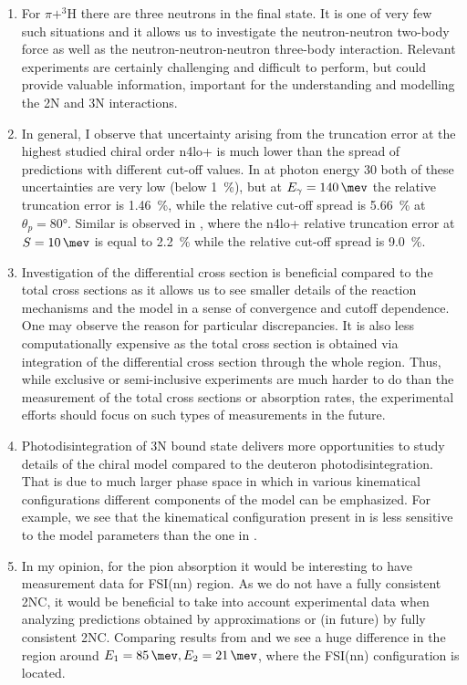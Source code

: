 \begin{enumerate}
    \item For $\pi + ^3$H there are three neutrons in the final state. It is one of very few such situations and it allows us to investigate the
    neutron-neutron two-body force as well as the neutron-neutron-neutron three-body interaction. 
    Relevant  experiments are certainly challenging and difficult to perform, but
    could provide valuable information, important for the understanding and modelling
    the 2N and 3N interactions.
    \item In general, I observe that uncertainty arising from the truncation error at the highest
    studied chiral order \gls{n4lo+} is much lower than the spread of predictions with different
    cut-off values. In  at photon energy \SI{30}{\mev} both of these
    uncertainties are very low (below \SI{1}{\percent}), but at $E_\gamma=\SI{140}{\mev}$
    the relative truncation error is \SI{1.46}{\percent}, while the relative cut-off spread is 
    \SI{5.66}{\percent} at $\theta_p= \ang{80}$.
    Similar is observed in , where the \gls{n4lo+} relative 
    truncation error at $S=\SI{10}{\mev}$ is equal to \SI{2.2}{\percent} while
    the relative cut-off spread is \SI{9.0}{\percent}.
    \item Investigation of the differential cross section is beneficial compared to the total cross sections as it allows us to see smaller details of the reaction mechanisms and the model in a sense of convergence and cutoff dependence. One may observe the reason for particular discrepancies.
    It is also less computationally expensive as the total cross section is obtained via integration of the differential cross section through the whole region.
    Thus, while exclusive or semi-inclusive experiments are much harder to do than the measurement of the total
    cross sections or absorption rates, the experimental efforts should focus on such types of measurements in the future. 
    \item  Photodisintegration of 3N bound state delivers more opportunities to study details of the chiral model compared to the deuteron photodisintegration.
    That is due to much larger phase space in which in various kinematical configurations different components of the model can be emphasized. For example, we see that the kinematical configuration present in  is less sensitive to the model parameters than the one in .
    \item In my opinion, for the pion absorption it would be interesting to have measurement data for FSI(nn) region. As we do not have a fully consistent 2NC, it would be beneficial to take into account experimental data when analyzing predictions obtained by approximations or (in future) by fully consistent 2NC. Comparing results from   and  we see a huge difference in the region around $E_1=\SI{85}{\mev}, E_2 = \SI{21}{\mev}$, where the FSI(nn) configuration is located.

\end{enumerate}
